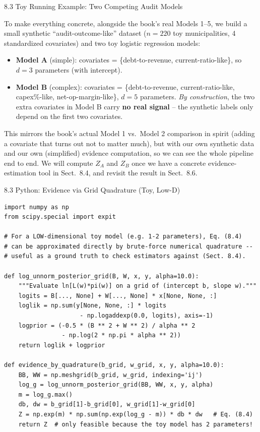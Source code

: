 \documentclass[aspectratio=169,10pt]{beamer}
\begin{document}
\begin{frame}[allowframebreaks]{8.3 Toy Running Example: Two Competing Audit Models}

To make everything concrete, alongside the book's real Models 1--5, we build a small synthetic ``audit-outcome-like'' dataset ($n=220$ toy municipalities, 4 standardized covariates) and two toy logistic regression models:

\begin{itemize}
  \item \textbf{Model A} (simple): covariates = \{debt-to-revenue, current-ratio-like\}, so $d=3$ parameters (with intercept).
  \item \textbf{Model B} (complex): covariates = \{debt-to-revenue, current-ratio-like, capex\%-like, net-op-margin-like\}, $d=5$ parameters. \emph{By construction}, the two extra covariates in Model B carry \textbf{no real signal} -- the synthetic labels only depend on the first two covariates.
\end{itemize}

This mirrors the book's actual Model 1 vs.\ Model 2 comparison in spirit (adding a covariate that turns out not to matter much), but with our own synthetic data and our own (simplified) evidence computation, so we can see the whole pipeline end to end. We will compute $Z_A$ and $Z_B$ once we have a concrete evidence-estimation tool in Sect.\ 8.4, and revisit the result in Sect.\ 8.6.

\end{frame}

\begin{frame}[fragile]{8.3 Python: Evidence via Grid Quadrature (Toy, Low-D)}
\begin{lstlisting}
import numpy as np
from scipy.special import expit

# For a LOW-dimensional toy model (e.g. 1-2 parameters), Eq. (8.4)
# can be approximated directly by brute-force numerical quadrature --
# useful as a ground truth to check estimators against (Sect. 8.4).

def log_unnorm_posterior_grid(B, W, x, y, alpha=10.0):
    """Evaluate ln[L(w)*pi(w)] on a grid of (intercept b, slope w)."""
    logits = B[..., None] + W[..., None] * x[None, None, :]
    loglik = np.sum(y[None, None, :] * logits
                     - np.logaddexp(0.0, logits), axis=-1)
    logprior = (-0.5 * (B ** 2 + W ** 2) / alpha ** 2
                - np.log(2 * np.pi * alpha ** 2))
    return loglik + logprior

def evidence_by_quadrature(b_grid, w_grid, x, y, alpha=10.0):
    BB, WW = np.meshgrid(b_grid, w_grid, indexing='ij')
    log_g = log_unnorm_posterior_grid(BB, WW, x, y, alpha)
    m = log_g.max()
    db, dw = b_grid[1]-b_grid[0], w_grid[1]-w_grid[0]
    Z = np.exp(m) * np.sum(np.exp(log_g - m)) * db * dw   # Eq. (8.4)
    return Z  # only feasible because the toy model has 2 parameters!
\end{lstlisting}
\end{frame}
\end{document}
